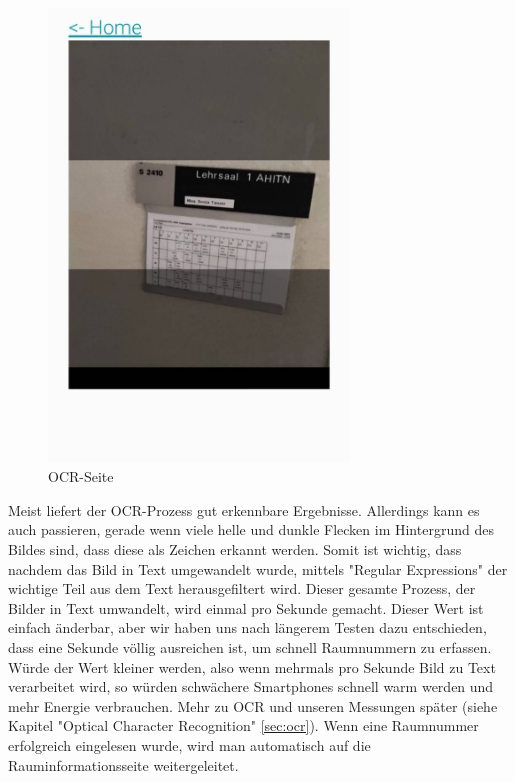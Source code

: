 \begin{figure}[H]
    \centering
    \includegraphics[width=80mm]{media/WebComponents/OCRSeite_light.jpg}
    \caption{OCR-Seite}
\end{figure}


Meist liefert der OCR-Prozess gut erkennbare Ergebnisse. Allerdings kann es auch passieren, gerade wenn viele helle und dunkle Flecken im Hintergrund des Bildes sind, dass diese als Zeichen erkannt werden. Somit ist wichtig, dass nachdem das Bild in Text umgewandelt wurde, mittels "Regular Expressions" der wichtige Teil aus dem Text herausgefiltert wird. Dieser gesamte Prozess, der Bilder in Text umwandelt, wird einmal pro Sekunde gemacht. Dieser Wert ist einfach änderbar, aber wir haben uns nach längerem Testen dazu entschieden, dass eine Sekunde völlig ausreichen ist, um schnell Raumnummern zu erfassen. Würde der Wert kleiner werden, also wenn mehrmals pro Sekunde Bild zu Text verarbeitet wird, so würden schwächere Smartphones schnell warm werden und mehr Energie verbrauchen. Mehr zu OCR und unseren Messungen später (siehe Kapitel "Optical Character Recognition" \ref{sec:ocr}). Wenn eine Raumnummer erfolgreich eingelesen wurde, wird man automatisch auf die Rauminformationsseite weitergeleitet.


